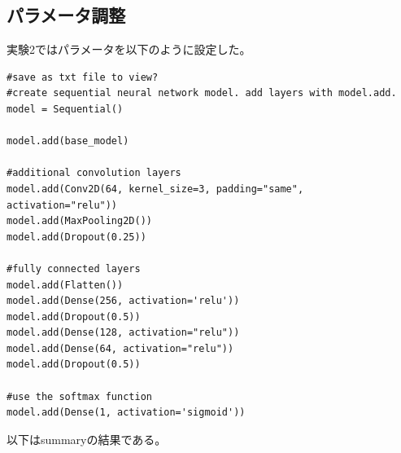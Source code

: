 \documentclass[a4paper, 11pt, titlepage]{jsarticle}
\begin{document}
\subsection{パラメータ調整}
実験2ではパラメータを以下のように設定した。\par
\begin{lstlisting}[caption=パラメータ(実験2),label=fuga]
#save as txt file to view?
#create sequential neural network model. add layers with model.add.
model = Sequential()

model.add(base_model)

#additional convolution layers
model.add(Conv2D(64, kernel_size=3, padding="same", activation="relu"))
model.add(MaxPooling2D())
model.add(Dropout(0.25))

#fully connected layers
model.add(Flatten())
model.add(Dense(256, activation='relu'))
model.add(Dropout(0.5))
model.add(Dense(128, activation="relu")) 
model.add(Dense(64, activation="relu")) 
model.add(Dropout(0.5))

#use the softmax function
model.add(Dense(1, activation='sigmoid'))

\end{lstlisting}\par
以下はsummaryの結果である。\par
\end{document}
